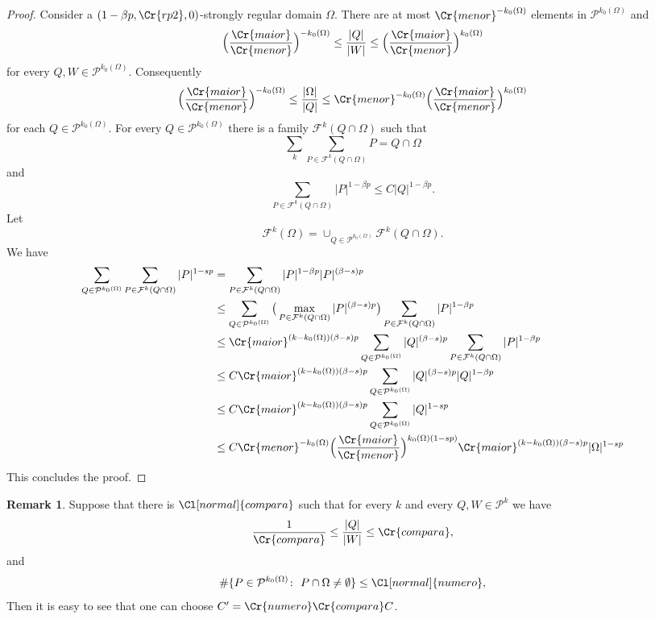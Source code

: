 \documentclass{amsart}
\theoremstyle{definition}
\newtheorem{remark}[theorem]{Remark}
\newcommand{\Cll}[2][normal]{\Cl[#1]{#2}}
\newcommand{\Crr}[1]{\Cr{#1}}
\begin{document}
\begin{proof} Consider a  $(1-\beta p,\Crr{rp2},0)$-strongly regular domain $\Omega$. There are at most $\Crr{menor}^{-k_0(\Omega)}$ elements in $\mathcal{P}^{k_0(\Omega)}$ and
$$\Big(\frac{\Crr{maior}}{\Crr{menor}}\Big)^{-k_0(\Omega)}  \leq \frac{|Q|}{|W|}\leq \Big(\frac{\Crr{maior}}{\Crr{menor}}\Big)^{k_0(\Omega)}$$
for every $Q,W\in \mathcal{P}^{k_0(\Omega)}$. Consequently
$$\Big(\frac{\Crr{maior}}{\Crr{menor}}\Big)^{-k_0(\Omega)}  \leq \frac{|\Omega|}{|Q|}\leq \Crr{menor}^{-k_0(\Omega)} \Big(\frac{\Crr{maior}}{\Crr{menor}}\Big)^{k_0(\Omega)}$$
for each $Q \in \mathcal{P}^{k_0(\Omega)}$.
For every $Q\in \mathcal{P}^{k_0(\Omega)}$  there is a family $\mathcal{F}^k(Q\cap \Omega)$ such that 
$$\sum_k \sum_{P\in \mathcal{F}^k(Q\cap \Omega)} P= Q\cap \Omega$$
and
$$ \sum_{P\in \mathcal{F}^k(Q\cap \Omega)}|P|^{1-\beta p}\leq C  |Q|^{1-\beta p}.$$
Let 
$$\mathcal{F}^k(\Omega)=\cup_{Q\in \mathcal{P}^{k_0(\Omega)} } \mathcal{F}^k(Q\cap \Omega).$$
We have
\begin{align*}  \sum_{Q\in  \mathcal{P}^{k_0(\Omega)}}\sum_{P\in \mathcal{F}^k(Q\cap \Omega)}|P|^{1-s p}&=\sum_{P\in \mathcal{F}^k(Q\cap \Omega)}|P|^{1-\beta p} |P|^{(\beta-s)p}\\
&\leq  \sum_{Q\in  \mathcal{P}^{k_0(\Omega)}} \big(\max_{P\in \mathcal{F}^k(Q\cap \Omega)}|P|^{(\beta-s)p} \big)  \sum_{P\in \mathcal{F}^k(Q\cap \Omega)}|P|^{1-\beta p}\\
&\leq  \Crr{maior}^{(k-k_0(\Omega))(\beta-s)p}  \sum_{Q\in  \mathcal{P}^{k_0(\Omega)}} |Q|^{(\beta-s)p}  \sum_{P\in \mathcal{F}^k(Q\cap \Omega)}|P|^{1-\beta p}\\
&\leq  C \Crr{maior}^{(k-k_0(\Omega))(\beta-s)p}  \sum_{Q\in  \mathcal{P}^{k_0(\Omega)}} |Q|^{(\beta-s)p} |Q|^{1-\beta p} \\
& \leq C \Crr{maior}^{(k-k_0(\Omega))(\beta-s)p} \sum_{Q\in  \mathcal{P}^{k_0(\Omega)}} |Q|^{1-s p}\\
&\leq   C  \Crr{menor}^{-k_0(\Omega)}   \Big(\frac{\Crr{maior}}{\Crr{menor}}\Big)^{k_0(\Omega)(1-s p)}   \Crr{maior}^{(k-k_0(\Omega))(\beta-s)p} |\Omega|^{1-s p}   
\end{align*} 
This concludes the proof. \end{proof}
\begin{remark} Suppose that there is $\Cll{compara}$ such that for every $k$ and every $Q, W\in \mathcal{P}^k$ we have
$$\frac{1}{\Crr{compara}}\leq    \frac{|Q|}{|W|}\leq \Crr{compara},$$
and 
$$\#\{  P\in \mathcal{P}^{k_0(\Omega)}\colon \ P\cap \Omega\neq \emptyset \}\leq \Cll{numero},$$
Then it is easy to see that one can choose $C'= \Crr{numero}\Crr{compara}C$.


\end{remark} 
\end{document}
